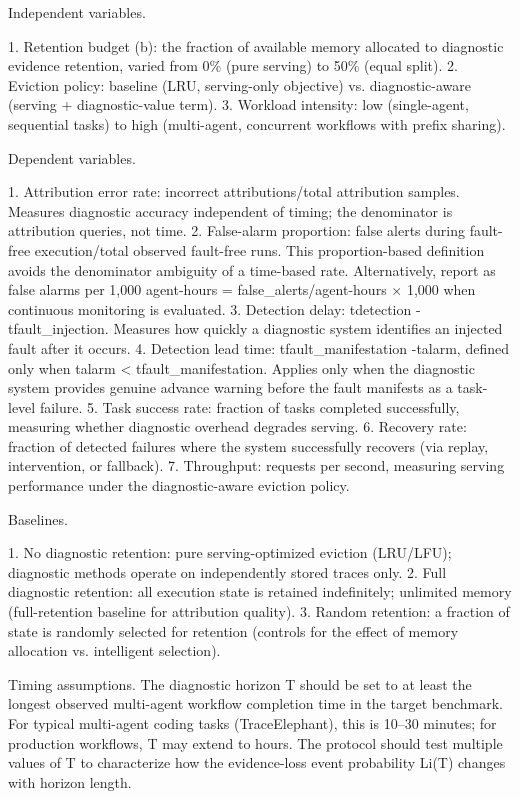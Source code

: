 \documentclass[preprint,12pt]{elsarticle}
\begin{document}
Independent variables.


1. Retention budget (b): the fraction of available memory allocated to diagnostic evidence retention, varied from 0\% (pure serving) to 50\% (equal split). 2. Eviction policy: baseline (LRU, serving-only objective) vs. diagnostic-aware (serving + diagnostic-value term). 3. Workload intensity: low (single-agent, sequential tasks) to high (multi-agent, concurrent workflows with prefix sharing).


Dependent variables.


1. Attribution error rate: incorrect attributions/total attribution samples. Measures diagnostic accuracy independent of timing; the denominator is attribution queries, not time. 2. False-alarm proportion: false alerts during fault-free execution/total observed fault-free runs. This proportion-based definition avoids the denominator ambiguity of a time-based rate. Alternatively, report as false alarms per 1,000 agent-hours = false\_alerts/agent-hours $\times$ 1,000 when continuous monitoring is evaluated. 3. Detection delay: tdetection -tfault\_injection. Measures how quickly a diagnostic system identifies an injected fault after it occurs. 4. Detection lead time: tfault\_manifestation -talarm, defined only when talarm < tfault\_manifestation. Applies only when the diagnostic system provides genuine advance warning before the fault manifests as a task-level failure. 5. Task success rate: fraction of tasks completed successfully, measuring whether diagnostic overhead degrades serving. 6. Recovery rate: fraction of detected failures where the system successfully recovers (via replay, intervention, or fallback). 7. Throughput: requests per second, measuring serving performance under the diagnostic-aware eviction policy.


Baselines.


1. No diagnostic retention: pure serving-optimized eviction (LRU/LFU); diagnostic methods operate on independently stored traces only. 2. Full diagnostic retention: all execution state is retained indefinitely; unlimited memory (full-retention baseline for attribution quality). 3. Random retention: a fraction of state is randomly selected for retention (controls for the effect of memory allocation vs. intelligent selection).


Timing assumptions. The diagnostic horizon T should be set to at least the longest observed multi-agent workflow completion time in the target benchmark. For typical multi-agent coding tasks (TraceElephant), this is 10--30 minutes; for production workflows, T may extend to hours. The protocol should test multiple values of T to characterize how the evidence-loss event probability Li(T) changes with horizon length.
\end{document}
